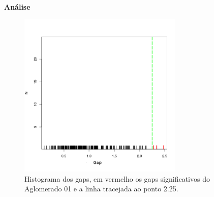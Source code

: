 \documentclass[xcolor=dvipsnames,10pt]{beamer}
\begin{document}
\begin{frame}{\textbf{Análise}}
  \begin{figure}
     \centering
    \includegraphics[height=0.7\textheight,width=0.7\textwidth]{resultados/gaps.png}
    \caption{Histograma dos gaps, em vermelho os gaps significativos do Aglomerado 01 e a linha tracejada ao ponto 2.25.}
  \end{figure}
\end{frame}
\end{document}
